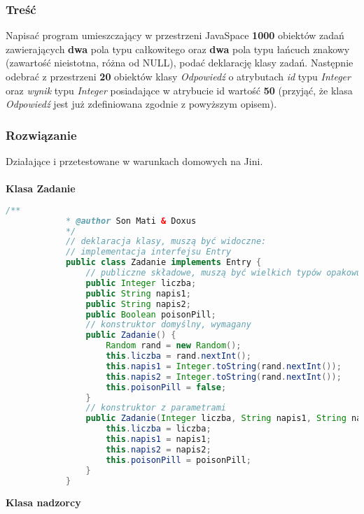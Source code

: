 		\subsubsection{Treść}
			Napisać program umieszczający w przestrzeni JavaSpace \textbf{1000} obiektów zadań zawierających \textbf{dwa} pola typu całkowitego oraz \textbf{dwa} pola typu łańcuch znakowy (zawartość nieistotna, różna od NULL), podać deklarację klasy zadań. Następnie odebrać z przestrzeni \textbf{20} obiektów klasy \textit{Odpowiedź} o atrybutach \textit{id} typu \textit{Integer} oraz \textit{wynik} typu \textit{Integer} posiadające w atrybucie id wartość \textbf{50} (przyjąć, że klasa \textit{Odpowiedź} jest już zdefiniowana zgodnie z powyższym opisem).
		\subsubsection{Rozwiązanie}
			Działające i przetestowane w warunkach domowych na Jini.\\\\
			\textbf{Klasa Zadanie}
			\begin{lstlisting}[language=Java]
			/**
			* @author Son Mati & Doxus
			*/
			// deklaracja klasy, muszą być widoczne:
			// implementacja interfejsu Entry
			public class Zadanie implements Entry {
				// publiczne składowe, muszą być wielkich typów opakowujących
				public Integer liczba;
				public String napis1;
				public String napis2;
				public Boolean poisonPill;
				// konstruktor domyślny, wymagany
				public Zadanie() {
					Random rand = new Random();
					this.liczba = rand.nextInt();
					this.napis1 = Integer.toString(rand.nextInt());
					this.napis2 = Integer.toString(rand.nextInt());
					this.poisonPill = false;
				}
				// konstruktor z parametrami
				public Zadanie(Integer liczba, String napis1, String napis2, Boolean poisonPill) {
					this.liczba = liczba;
					this.napis1 = napis1;
					this.napis2 = napis2;
					this.poisonPill = poisonPill;
				}
			}
			\end{lstlisting}
			\newpage
			\textbf{Klasa nadzorcy}
